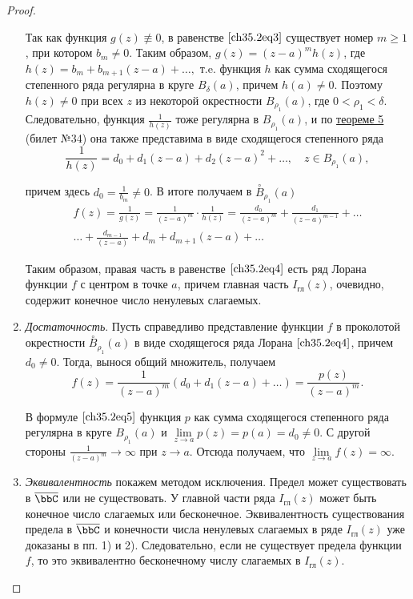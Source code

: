 \begin{proof}
\begin{enumerate}
Так как функция $g(z) \not\equiv 0$, в равенстве $\eqref{ch35.2eq3}$ существует номер $m \ge 1$, при котором $b_m \not= 0$. Таким образом, $g(z) = (z - a)^{m} h(z)$, где $h(z) = b_m + b_{m + 1} (z - a) + \ldots ,$ т.e. функция $h$ как сумма сходящегося степенного ряда регулярна в круге $B_{\delta}(a)$, причем $h(a) \not= 0$. Поэтому $h(z) \not= 0$ при всех $z$ из некоторой окрестности $B_{\rho_1}(a)$, где $0 < \rho_1 < \delta$. Следовательно, функция $\frac{1}{h(z)}$ тоже регулярна в $B_{\rho_1}(a)$, и  по \hyperref[abc29]{теореме 5} (билет №34) она также представима в виде сходящегося степенного ряда
$$
\frac{1}{h(z)} = d_0 + d_1 (z - a) + d_2 (z - a)^2 + \ldots , \quad z \in B_{\rho_1}(a),
$$

причем здесь $d_0 = \frac{1}{b_m} \not= 0$. В итоге получаем в $\overset{\circ}{B}_{\rho_1}(a)$
\begin{multline} \label{ch35.2eq4}
f(z) = \frac{1}{g(z)} = \frac{1}{(z - a)^m} \cdot \frac{1}{h(z)} = \frac{d_0}{(z - a)^m} + \frac{d_1}{(z - a)^{m - 1}} + \ldots \\ \ldots+ \frac{d_{m - 1}}{(z - a)} + d_m + d_{m + 1} (z - a) + \ldots 
\end{multline}

Таким образом, правая часть в равенстве $\eqref{ch35.2eq4}$ есть ряд Лорана функции $f$ с центром в точке $a$, причем главная часть $I_{\text{гл}}(z)$, очевидно, содержит конечное число ненулевых слагаемых.

\item \textit{Достаточность}. Пусть справедливо представление функции $f$ в проколотой окрестности $\overset{\circ}{B}_{\rho_1}(a)$ в виде сходящегося ряда Лорана $\eqref{ch35.2eq4}$, причем $d_0 \not= 0$. Тогда, вынося общий множитель, получаем
\begin{equation} \label{ch35.2eq5}
f(z) = \frac{1}{(z - a)^m} (d_0 + d_1 (z - a) + \ldots) = \frac{p(z)}{(z - a)^m}.
\end{equation}

В формуле $\eqref{ch35.2eq5}$ функция $p$ как сумма сходящегося степенного ряда регулярна в круге $B_{\rho_1}(a)$ и $\lim\limits_{z \to a} p(z) = p(a) = d_0 \not= 0$. С другой стороны $\frac{1}{(z - a)^m} \to \infty$ при $z \to a$. Отсюда получаем, что $\lim\limits_{z \to a} f(z) = \infty$.

\item	\textit{Эквивалентность} покажем методом исключения. Предел может существовать в $\overline{\bbC}$ или не существовать. У главной части ряда $I_{\text{гл}}(z)$ может быть конечное число слагаемых или бесконечное. Эквивалентность существования предела в $\overline{\bbC}$ и конечности числа ненулевых слагаемых в ряде $I_{\text{гл}}(z)$ уже доказаны в пп. 1) и 2). Следовательно, если не существует предела функции $f$, то это эквивалентно бесконечному числу слагаемых в $I_{\text{гл}}(z)$.


\end{enumerate}
\end{proof}
